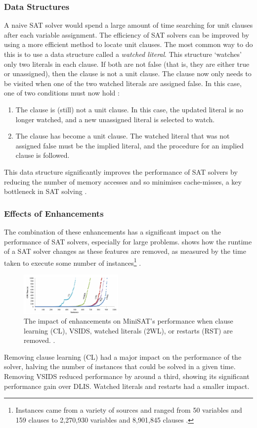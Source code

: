 \documentclass[conference]{IEEEtran}
\begin{document}
\subsubsection{Data Structures}
A naive SAT solver would spend a large amount of time searching for unit clauses after each variable assignment. The efficiency of SAT solvers can be improved by using a more efficient method to locate unit clauses. The most common way to do this is to use a data structure called a \emph{watched literal}. This structure `watches' only two literals in each clause. If both are not false (that is, they are either true or unassigned), then the clause is not a unit clause. The clause now only needs to be visited when one of the two watched literals are assigned false. In this case, one of two conditions must now hold \cite{moskewicz2001chaff}:
\begin{enumerate}
    \item The clause is (still) not a unit clause. In this case, the updated literal is no longer watched, and a new unassigned literal is selected to watch.
    \item The clause has become a unit clause. The watched literal that was not assigned false must be the implied literal, and the procedure for an implied clause is followed.
\end{enumerate}
This data structure significantly improves the performance of SAT solvers by reducing the number of memory accesses and so minimises cache-misses, a key bottleneck in SAT solving \cite{moskewicz2001chaff}.

\subsubsection{Effects of Enhancements}
The combination of these enhancements has a significant impact on the performance of SAT solvers, especially for large problems.  shows how the runtime of a SAT solver changes as these features are removed, as measured by the time taken to execute some number of instances\footnote{Instances came from a variety of sources and ranged from 50 variables and 159 clauses to 2,270,930 variables and 8,901,845 clauses \cite{katebi2011empirical}.} \cite{katebi2011empirical}.
\begin{figure}
    \centering
    \includegraphics[width=0.45\textwidth]{images/impact_of_enhancements.png}
    \caption{The impact of enhancements on MiniSAT's performance when clause learning (CL), VSIDS, watched literals (2WL), or restarts (RST) are removed. \cite{katebi2011empirical}.}
    \label{fig:impact_of_enhancements}
\end{figure}
Removing clause learning (CL) had a major impact on the performance of the solver, halving the number of instances that could be solved in a given time. Removing VSIDS reduced performance by around a third, showing its significant performance gain over DLIS. Watched literals and restarts had a smaller impact.
\end{document}
